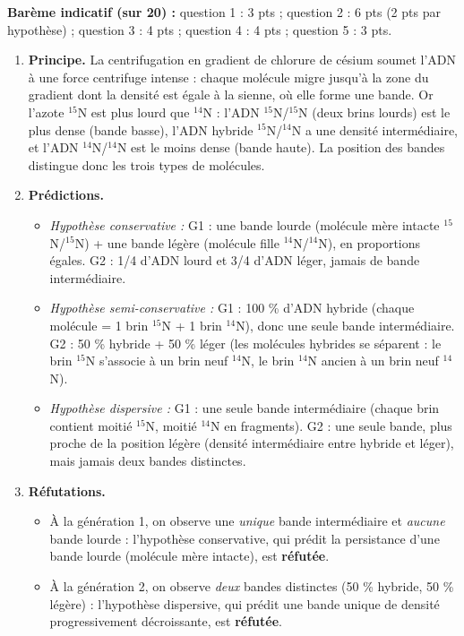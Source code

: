 \documentclass[11pt]{article}
\begin{document}
\begin{corrige}
\textbf{Barème indicatif (sur 20) :} question 1 : 3 pts ; question 2 : 6 pts (2 pts par hypothèse) ; question 3 : 4 pts ; question 4 : 4 pts ; question 5 : 3 pts.

\begin{enumerate}
\item \textbf{Principe.} La centrifugation en gradient de chlorure de césium soumet l'ADN à une force centrifuge intense : chaque molécule migre jusqu'à la zone du gradient dont la densité est égale à la sienne, où elle forme une bande. Or l'azote $^{15}$N est plus lourd que $^{14}$N : l'ADN $^{15}$N/$^{15}$N (deux brins lourds) est le plus dense (bande basse), l'ADN hybride $^{15}$N/$^{14}$N a une densité intermédiaire, et l'ADN $^{14}$N/$^{14}$N est le moins dense (bande haute). La position des bandes distingue donc les trois types de molécules.
\item \textbf{Prédictions.}
\begin{itemize}
\item \emph{Hypothèse conservative :} G1 : une bande lourde (molécule mère intacte $^{15}$N/$^{15}$N) + une bande légère (molécule fille $^{14}$N/$^{14}$N), en proportions égales. G2 : 1/4 d'ADN lourd et 3/4 d'ADN léger, jamais de bande intermédiaire.
\item \emph{Hypothèse semi-conservative :} G1 : 100 \% d'ADN hybride (chaque molécule = 1 brin $^{15}$N + 1 brin $^{14}$N), donc une seule bande intermédiaire. G2 : 50 \% hybride + 50 \% léger (les molécules hybrides se séparent : le brin $^{15}$N s'associe à un brin neuf $^{14}$N, le brin $^{14}$N ancien à un brin neuf $^{14}$N).
\item \emph{Hypothèse dispersive :} G1 : une seule bande intermédiaire (chaque brin contient moitié $^{15}$N, moitié $^{14}$N en fragments). G2 : une seule bande, plus proche de la position légère (densité intermédiaire entre hybride et léger), mais jamais deux bandes distinctes.
\end{itemize}
\item \textbf{Réfutations.}
\begin{itemize}
\item À la génération 1, on observe une \emph{unique} bande intermédiaire et \emph{aucune} bande lourde : l'hypothèse conservative, qui prédit la persistance d'une bande lourde (molécule mère intacte), est \textbf{réfutée}.
\item À la génération 2, on observe \emph{deux} bandes distinctes (50 \% hybride, 50 \% légère) : l'hypothèse dispersive, qui prédit une bande unique de densité progressivement décroissante, est \textbf{réfutée}.

\end{itemize}
\end{enumerate}
\end{corrige}
\end{document}
